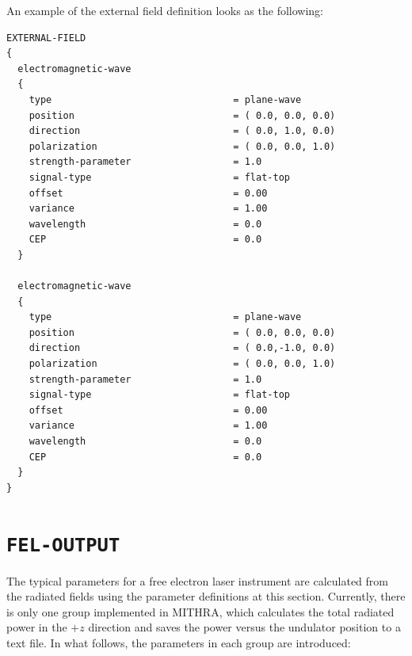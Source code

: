 An example of the external field definition looks as the following:
%
\begin{snugshade}
\begin{Verbatim}[fontsize=\small, tabsize = 4]
EXTERNAL-FIELD
{
  electromagnetic-wave
  {
    type                                = plane-wave
    position                            = ( 0.0, 0.0, 0.0)
    direction                           = ( 0.0, 1.0, 0.0)
    polarization                        = ( 0.0, 0.0, 1.0)
    strength-parameter                  = 1.0
    signal-type                         = flat-top
    offset                              = 0.00
    variance                            = 1.00
    wavelength                          = 0.0
    CEP                                 = 0.0
  }

  electromagnetic-wave
  {
    type                                = plane-wave
    position                            = ( 0.0, 0.0, 0.0)
    direction                           = ( 0.0,-1.0, 0.0)
    polarization                        = ( 0.0, 0.0, 1.0)
    strength-parameter                  = 1.0
    signal-type                         = flat-top
    offset                              = 0.00
    variance                            = 1.00
    wavelength                          = 0.0
    CEP                                 = 0.0
  }
}
\end{Verbatim}
\end{snugshade}
%

\section{\texttt{FEL-OUTPUT}}

The typical parameters for a free electron laser instrument are calculated from the radiated fields using the parameter definitions at this section.
%
Currently, there is only one group implemented in MITHRA, which calculates the total radiated power in the $+z$ direction and saves the power versus the undulator position to a text file.
%
In what follows, the parameters in each group are introduced:

